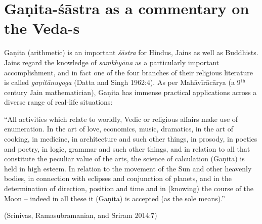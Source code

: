 \section*{Gaṇita-śāstra as a commentary on the Veda-s}

Gaṇita (arithmetic) is an important {\sl śāstra} for Hindus, Jains as well as Buddhists. Jains regard the knowledge of {\sl saṃkhyāna} as a particularly important accomplishment, and in fact one of the four branches of their religious literature is called {\sl gaṇitānuyoga} (Datta and Singh 1962:4). As per Mahāvīrācārya (a 9$^{\text{th}}$ century Jain mathematician), Gaṇita has immense practical applications across a diverse range of real-life situations: 
\begin{myquote}
``All activities which relate to worldly, Vedic or religious affairs make use of enumeration. In the art of love, economics, music, dramatics, in the art of cooking, in medicine, in architecture and such other things, in prosody, in poetics and poetry, in logic, grammar and such other things, and in relation to all that constitute the peculiar value of the arts, the science of calculation (Gaṇita) is held in high esteem. In relation to the movement of the Sun and other heavenly bodies, in connection with eclipses and conjunction of planets, and in the determination of direction, position and time and in (knowing) the course of the Moon -- indeed in all these it (Gaṇita) is accepted (as the sole means).''

\hfill (Srinivas, Ramasubramanian, and Sriram 2014:7)
\end{myquote}

